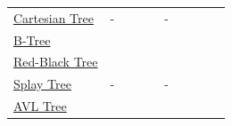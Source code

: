 \documentclass[10pt, a4paper, landscape]{article}
\newcommand{\redbox}[1]{\psframebox[linecolor=textRed, fillstyle=solid, fillcolor=backRed, framearc=0.25]{\color{textRed}{#1}}}
\newcommand{\yellowbox}[1]{\psframebox[linecolor=textYellow, fillstyle=solid, fillcolor=backYellow, framearc=0.25]{\color{textYellow}{#1}}}
\newcommand{\greenbox}[1]{\psframebox[linecolor=textGreen, fillstyle=solid, fillcolor=backGreen, framearc=0.25]{\color{textGreen}{#1}}}
\begin{document}
\begin{table}[h!]
\begin{tabular}{llllllllll}
\href{https://en.wikipedia.org/wiki/Cartesian_tree}{Cartesian Tree} & - & \greenbox{$O(\log n)$} & \greenbox{$O(\log n)$} & \greenbox{$O(\log n)$} & - & \redbox{$O(n)$} & \redbox{$O(n)$} & \redbox{$O(n)$} & \yellowbox{$O(n)$}\\
\href{http://en.wikipedia.org/wiki/B_tree}{B-Tree} & \yellowbox{$O(\log n)$} & \greenbox{$O(\log n)$} & \greenbox{$O(\log n)$} & \greenbox{$O(\log n)$} & \yellowbox{$O(\log n)$} & \greenbox{$O(\log n)$} & \greenbox{$O(\log n)$} & \greenbox{$O(\log n)$} & \yellowbox{$O(n)$}\\
\href{http://en.wikipedia.org/wiki/Red-black_tree}{Red-Black Tree} & \yellowbox{$O(\log n)$} & \greenbox{$O(\log n)$} & \greenbox{$O(\log n)$} & \greenbox{$O(\log n)$} & \yellowbox{$O(\log n)$} & \greenbox{$O(\log n)$} & \greenbox{$O(\log n)$} & \greenbox{$O(\log n)$} & \yellowbox{$O(n)$}\\
\href{https://en.wikipedia.org/wiki/Splay_tree}{Splay Tree} & - & \greenbox{$O(\log n)$} & \greenbox{$O(\log n)$} & \greenbox{$O(\log n)$} & - & \greenbox{$O(\log n)$} & \greenbox{$O(\log n)$} & \greenbox{$O(\log n)$} & \yellowbox{$O(n)$}\\
\href{http://en.wikipedia.org/wiki/AVL_tree}{AVL Tree} & \yellowbox{$O(\log n)$} & \greenbox{$O(\log n)$} & \greenbox{$O(\log n)$} & \greenbox{$O(\log n)$} & \yellowbox{$O(\log n)$} & \greenbox{$O(\log n)$} & \greenbox{$O(\log n)$} & \greenbox{$O(\log n)$} & \yellowbox{$O(n)$}\\
\end{tabular}
\end{table}
%
%
\end{document}
